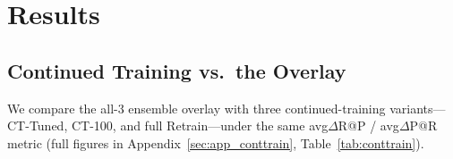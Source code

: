 \documentclass[11pt]{article}
\begin{document}
%
\section{Results}\label{sec:results}

\subsection{Continued Training vs.\ the Overlay}\label{sec:results:conttrain}

We compare the all-3 ensemble overlay with three continued-training variants---CT-Tuned, CT-100, and
full Retrain---under the same avg$\Delta$R@P / avg$\Delta$P@R metric (full figures in
Appendix~\ref{sec:app_conttrain}, Table~\ref{tab:conttrain}).

\begin{table}[t]
  \centering
  \footnotesize
  \renewcommand{\arraystretch}{0.95}
  \caption{Per-backbone and ensemble results: \textbf{avg$\Delta$R@P} / avg$\Delta$P@R (absolute
    differences, \%) relative to the frozen base at its production cut-offs (Section~\ref{sec:method:ensemble}).
    \emph{Anchors}: production's OOT precision and recall at the split's cut-offs, the fixed levels at
    which $\Delta$R@P and $\Delta$P@R are taken. \textbf{Ensemble} is the primary result (bold where
    positive). Var-IV shares Var-III's population. CoT, SlW, MoE: Section~\ref{sec:setup}.}
  \label{tab:main}
\end{table}
\end{document}
